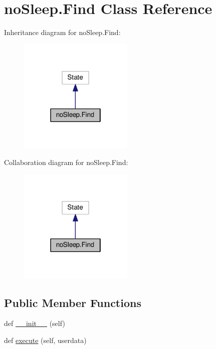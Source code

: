 \hypertarget{classnoSleep_1_1Find}{}\section{no\+Sleep.\+Find Class Reference}
\label{classnoSleep_1_1Find}


Inheritance diagram for no\+Sleep.\+Find\+:
\nopagebreak
\begin{figure}[H]
\begin{center}
\leavevmode
\includegraphics[width=154pt]{classnoSleep_1_1Find__inherit__graph}
\end{center}
\end{figure}


Collaboration diagram for no\+Sleep.\+Find\+:
\nopagebreak
\begin{figure}[H]
\begin{center}
\leavevmode
\includegraphics[width=154pt]{classnoSleep_1_1Find__coll__graph}
\end{center}
\end{figure}
\subsection*{Public Member Functions}
\begin{DoxyCompactItemize}
\item 
def \hyperlink{classnoSleep_1_1Find_aff34d2da153e2a1aff424ec9a02dcdb2}{\+\_\+\+\_\+init\+\_\+\+\_\+} (self)
\item 
def \hyperlink{classnoSleep_1_1Find_a3a023c41893fa105656edec93c0891cf}{execute} (self, userdata)
\end{DoxyCompactItemize}
